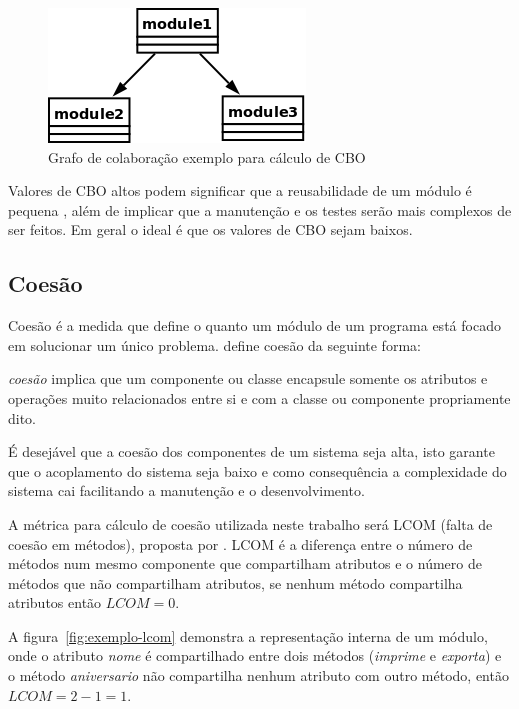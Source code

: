 \begin{figure}[h]
\center
\includegraphics[scale=0.4]{imagens/exemplo-cbo}
\caption{Grafo de colaboração exemplo para cálculo de CBO}
\label{fig:exemplo-cbo}
\end{figure}

Valores de CBO altos podem significar que a reusabilidade de um módulo é
pequena \cite{engenhariaDeSoftwarePressman}, além de implicar que a manutenção
e os testes serão mais complexos de ser feitos. Em geral o ideal é que os
valores de CBO sejam baixos.

\subsection{Coesão}

Coesão é a medida que define o quanto um módulo de um programa está focado em
solucionar um único problema.  define
coesão da seguinte forma:

\begin{citacao}
{\it coesão} implica que um componente ou classe encapsule somente os atributos
e operações muito relacionados entre si e com a classe ou componente
propriamente dito. \cite{engenhariaDeSoftwarePressman}
\end{citacao}

É desejável que a coesão dos componentes de um sistema seja alta, isto garante
que o acoplamento do sistema seja baixo e como consequência a complexidade do
sistema cai facilitando a manutenção e o desenvolvimento. 

A métrica para cálculo de coesão utilizada neste trabalho será LCOM (falta de
coesão em métodos), proposta por . LCOM é a
diferença entre o número de métodos num mesmo componente que compartilham
atributos e o número de métodos que não compartilham atributos, se nenhum
método compartilha atributos então $LCOM = 0$.

A figura~\ref{fig:exemplo-lcom} demonstra a representação interna de um módulo,
onde o atributo {\it nome} é compartilhado entre dois métodos ({\it imprime} e
{\it exporta}) e o método {\it aniversario} não compartilha nenhum atributo com
outro método, então $LCOM = 2 - 1 = 1$.

